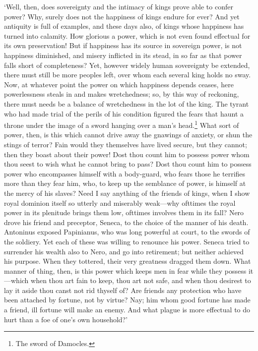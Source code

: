 \documentclass[11pt]{book}
\begin{document}
`Well, then, does sovereignty and the intimacy of kings prove able to
confer power? Why, surely does not the happiness of kings endure for
ever? And yet antiquity is full of examples, and these days also, of
kings whose happiness has turned into calamity. How glorious a power,
which is not even found effectual for its own \linebreak preservation! But if
happiness has its source in sov\-er\-eign power, is not happiness
diminished, and misery inflicted in its stead, in so far as that power
falls short of completeness? Yet, however widely human sovereignty be
extended, there must still be more peoples left, over whom each several
king holds no sway. Now, at whatever point the power on which happiness
depends ceases, here powerlessness steals in and makes wretchedness; so,
by this way of reckoning, there must needs be a balance of wretch\-ed\-ness
in the lot of the king. The tyrant who had made trial of the perils of
his condition figured the fears that haunt a throne under the image of a
sword hanging over a man's head.\footnote{The sword of Damocles.} What sort of pow\-er, then, is this
which cannot drive away the gnawings of anxiety, or shun the stings of
terror? Fain would they themselves have lived secure, but they cannot;
then they boast about their pow\-er! Dost thou count him to possess power
whom thou seest to wish what he cannot bring to pass? Dost thou count
him to possess power who encompasses himself with a body-guard, who
fears those he terrifies more than they fear him, who, to keep up the
semblance of power, is himself at the mercy of his slaves? Need I say
anything of the friends of kings, when I show royal dominion itself so
utterly and miserably weak---why ofttimes the royal power in its
plenitude brings them low, ofttimes involves them in its fall? Nero
drove his friend and preceptor, Seneca, to the choice of the manner of
his death. Antoninus exposed Papinianus, who was long powerful at
court, to the swords of the soldiery. Yet each of these was willing to
renounce his power. Seneca tried to surrender his wealth also to Nero,
and go into retirement; but neither achieved his purpose. When they
tottered, their very greatness dragged them down. What manner of thing,
then, is this power which keeps men in fear while they possess it---which
when thou art fain to keep, thou art not safe, and when thou desirest to
lay it aside thou canst not rid thyself of? Are friends any protection
who have been attached by fortune, not by virtue? Nay; him whom good
fortune has made a friend, ill fortune will make an enemy. And what
plague is more effectual to do hurt than a foe of one's own household?'
\end{document}
